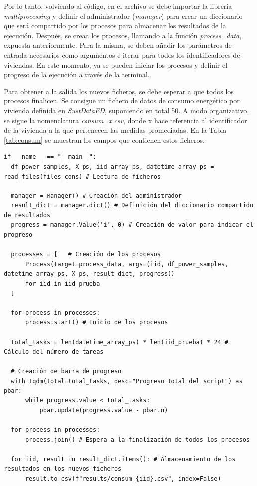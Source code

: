 \vspace{3mm}

Por lo tanto, volviendo al código, en el archivo se debe importar la librería \textit{multiprocessing} y definir el administrador (\textit{manager}) para crear un diccionario que será compartido por los procesos para almacenar los resultados de la ejecución. Después, se crean los procesos, llamando a la función \textit{process\_data}, expuesta anteriormente. Para la misma, se deben añadir los parámetros de entrada necesarios como argumentos e iterar para todos los identificadores de viviendas. En este momento, ya se pueden iniciar los procesos y definir el progreso de la ejecución a través de la terminal. 

\vspace{3mm}

Para obtener a la salida los nuevos ficheros, se debe esperar a que todos los procesos finalicen. Se consigue un fichero de datos de consumo energético por vivienda definida en \textit{SustDataED}, suponiendo en total 50. A modo organizativo, se sigue la nomenclatura \textit{consum\_x.csv}, donde x hace referencia al identificador de la vivienda a la que pertenecen las medidas promediadas. En la Tabla \ref{tab:consum} se muestran los campos que contienen estos ficheros. 

\pagebreak

\begin{lstlisting}[style=Python, caption={Creación de procesos}]
  if __name__ == "__main__":
  df_power_samples, X_ps, iid_array_ps, datetime_array_ps = read_files(files_cons) # Lectura de ficheros

  manager = Manager() # Creación del administrador
  result_dict = manager.dict() # Definición del diccionario compartido de resultados
  progress = manager.Value('i', 0) # Creación de valor para indicar el progreso

  processes = [   # Creación de los procesos
      Process(target=process_data, args=(iid, df_power_samples, datetime_array_ps, X_ps, result_dict, progress))
      for iid in iid_prueba
  ]

  for process in processes: 
      process.start() # Inicio de los procesos

  total_tasks = len(datetime_array_ps) * len(iid_prueba) * 24 # Cálculo del número de tareas

  # Creación de barra de progreso
  with tqdm(total=total_tasks, desc="Progreso total del script") as pbar:
      while progress.value < total_tasks:
          pbar.update(progress.value - pbar.n)

  for process in processes:
      process.join() # Espera a la finalización de todos los procesos

  for iid, result in result_dict.items(): # Almacenamiento de los resultados en los nuevos ficheros
      result.to_csv(f"results/consum_{iid}.csv", index=False) 
\end{lstlisting}

